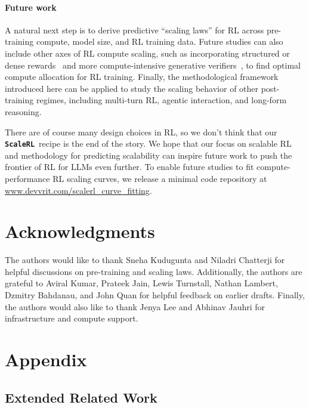 \documentclass[]{fairmeta} %
\newcommand{\scalerl}{\texttt{\textbf{ScaleRL}}}
\begin{document}
\paragraph{Future work}
A natural next step is to derive predictive ``scaling laws'' for RL across pre-training compute, model size, and RL training data.  Future studies can also include other axes of RL compute scaling, such as incorporating structured or dense rewards~\citep{rewardingprogresss} and more compute-intensive generative verifiers~\citep{zhang2025generativeverifiersrewardmodeling}, to find optimal compute allocation for RL training. Finally, the methodological framework introduced here can be applied to study the scaling behavior of other post-training regimes, including multi-turn RL, agentic interaction, and long-form reasoning.

There are of course many design choices in RL, so we don't think that our \scalerl\ recipe is the end of the story. We hope that our focus on scalable RL and methodology for predicting scalability can inspire future work to push the frontier of RL for LLMs even further.  To enable future studies to fit compute-performance RL scaling curves, we release a minimal code repository at \href{https://www.devvrit.com/scalerl_curve_fitting}{www.devvrit.com/scalerl\_curve\_fitting}.


\section{Acknowledgments}
The authors would like to thank Sneha Kudugunta and Niladri Chatterji for helpful discussions on pre-training and scaling laws. Additionally, the authors are grateful to Aviral Kumar, Prateek Jain, Lewis Turnstall, Nathan Lambert, Dzmitry Bahdanau, and John Quan for helpful feedback on earlier drafts. Finally, the authors would also like to thank Jenya Lee and Abhinav Jauhri for infrastructure and compute support.




\appendix
\newpage
\section{Appendix}

\subsection{Extended Related Work}\label{appendix:related}
\end{document}
